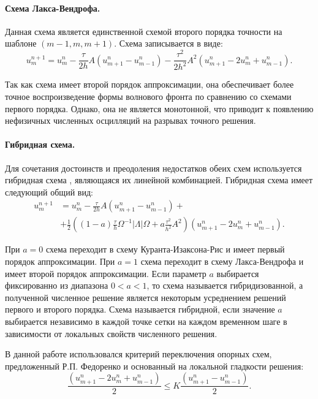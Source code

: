 \paragraph{Схема Лакса-Вендрофа.} Данная схема является единственной схемой второго порядка точности на шаблоне $(m-1, m, m+1)$. Схема записывается в виде:
\begin{equation}
	\label{LW scheme}
	u^{n+1}_m = u^n_m - \frac{\tau}{2h} A (u^n_{m+1} - u^n_{m-1})
	 - \frac{\tau^2}{2h^2} A^2 (u^n_{m+1} - 2u^n_m + u^n_{m-1}) .
\end{equation}

Так как схема имеет второй порядок аппроксимации, она обеспечивает более точное воспроизведение формы волнового фронта по сравнению со схемами первого порядка. Однако, она не является монотонной, что приводит к появлению нефизичных численных осцилляций на разрывах точного решения.


\paragraph{Гибридная схема.} Для сочетания достоинств и преодоления недостатков обеих схем используется гибридная схема \cite{fedorenko}, являющаяся их линейной комбинацией. Гибридная схема имеет следующий общий вид:
\begin{align}
\label{hybrid scheme}
u^{n+1}_m &= u^n_m - \frac{\tau}{2h} A (u^n_{m+1} - u^n_{m-1}) + \nonumber\\
	 &+ \frac{1}{2} ((1-a) \frac{\tau}{h} \Omega^{-1} |\Lambda| \Omega + a \frac{\tau^2}{h^2} A^2 ) (u^n_{m+1} - 2u^n_m + u^n_{m-1}).
\end{align}

При $a = 0$ схема переходит в схему Куранта-Изаксона-Рис и имеет первый порядок аппроксимации. При $a = 1$ схема переходит в схему Лакса-Вендрофа и имеет второй порядок аппроксимации. Если параметр $a$ выбирается фиксированно из диапазона $0 < a < 1$, то схема называется гибридизованной, а полученной численное решение является некоторым усреднением решений первого и второго порядка. Схема называется гибридной, если значение $a$ выбирается независимо в каждой точке сетки на каждом временном шаге в зависимости от локальных свойств численного решения.

В данной работе использовался критерий переключения опорных схем, предложенный Р.П. Федоренко и основанный на локальной гладкости решения:
\begin{equation}
	\label{Fedorenko criterium}
	\frac{(u^n_{m+1} - 2u^n_m + u^n_{m-1})}{2} \le K \frac{(u^n_{m+1} - u^n_{m-1})}{2} .
\end{equation}

